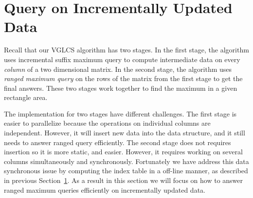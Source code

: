 \section{Query on Incrementally Updated Data}
\label{sec:parallelIRMQ}

Recall that our VGLCS algorithm has two stages.  In the first stage,
the algorithm uses incremental suffix maximum query to compute
intermediate data on every {\em column} of a two dimensional matrix.
In the second stage, the algorithm uses {\em ranged maximum query} on
the rows of the matrix from the first stage to get the final answers.
These two stages work together to find the maximum in a given
rectangle area.

The implementation for two stages have different challenges.  The first
stage is easier to parallelize because the operations on individual
columns are independent.  However, it will insert new data into the data
structure, and it still needs to answer ranged query efficiently. The
second stage does not requires insertion so it is more static, and
easier.  However, it requires working on several columns simultaneously
and synchronously.  Fortunately we have address this data synchronous
issue by computing the index table in a off-line manner, as described in
previous Section~\ref{sec:parallelIRMQ}.  As a result in this section we
will focus on how to answer ranged maximum queries efficiently on
incrementally updated data.



\iffalse VGLCS 問題主要分成縱向和橫向兩階段，縱向處理每一列的區間極值
查找，橫向處理每一行的區間極值查找，兩者合併構成區域極值查找。在縱向方
面為數個獨立的數據結構，這部分易於平行；相反地，在橫向方面，需要共同協
作一個數據結構。綜觀這兩者的差異，縱向需要動態的後綴插入和區間查詢，而
橫向可以離線完成區間查找。在上一節中，我們提出在橫向處理的實作，若限制
上述的實作方案在單一處理器上，時間複雜度的瓶頸在於縱向的動態更新與查找。
在這個章節中，我們提出支持動態插入和區間查找的數據結構，最後的成果如表
\ref{tlb:cmp-complexity}。
\fi

